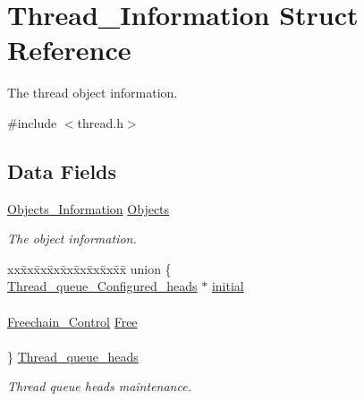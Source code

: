 \hypertarget{structThread__Information}{}\section{Thread\+\_\+\+Information Struct Reference}
\label{structThread__Information}


The thread object information.  




{\ttfamily \#include $<$thread.\+h$>$}

\subsection*{Data Fields}
\begin{DoxyCompactItemize}
\item 
\mbox{\label{structThread__Information_a7eb49e2a5daa273c77a6b9483d66bf46}} 
\mbox{\hyperlink{structObjects__Information}{Objects\+\_\+\+Information}} \mbox{\hyperlink{structThread__Information_a7eb49e2a5daa273c77a6b9483d66bf46}{Objects}}
\begin{DoxyCompactList}\small\item\em The object information. \end{DoxyCompactList}\item 
\mbox{\label{structThread__Information_a3b95595eea899001780a1ce04a825a2e}} 
\begin{tabbing}
xx\=xx\=xx\=xx\=xx\=xx\=xx\=xx\=xx\=\kill
union \{\\
\>\mbox{\hyperlink{group__RTEMSScoreThread_gac2edd6c043930e8159685c0cb2e19ca7}{Thread\_queue\_Configured\_heads}} $\ast$ \mbox{\hyperlink{structThread__Information_ae4f6930be231a8d7bb4e406859938f01}{initial}}\\
\>\\
\>\mbox{\hyperlink{structFreechain__Control}{Freechain\_Control}} \mbox{\hyperlink{structThread__Information_a3c28243117c72aed1fe9320944e74639}{Free}}\\
\>\\
\} \mbox{\hyperlink{structThread__Information_a3b95595eea899001780a1ce04a825a2e}{Thread\_queue\_heads}}\\

\end{tabbing}\begin{DoxyCompactList}\small\item\em Thread queue heads maintenance. \end{DoxyCompactList}\end{DoxyCompactItemize}


